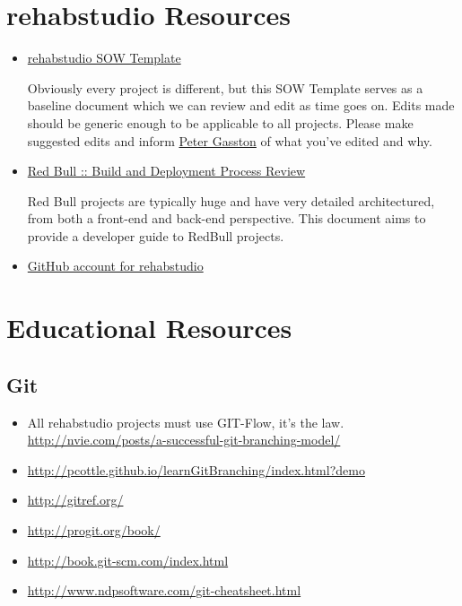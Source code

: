 \documentclass[letterpaper,10pt,english]{sphinxmanual}
\begin{document}
\section{rehabstudio Resources}
\label{resources:rehabstudio-resources}\begin{itemize}
\item {} 
\href{https://docs.google.com/a/rehabstudio.com/document/d/1OH39dbghjzTWmhfLngvC0pRRFPx8mfN8ABfTTF6buOQ/edit}{rehabstudio SOW Template}

Obviously every project is different, but this SOW Template serves as a baseline document which we can review and edit as time goes on.  Edits made should be generic enough to be applicable to all projects.  Please make suggested edits and inform \href{mailto:peter@rehabstudio.com}{Peter Gasston} of what you've edited and why.

\item {} 
\href{https://docs.google.com/a/rehabstudio.com/document/d/1humc\_GAfWQwqr4BGNeRd2zIOXbBrmnnvpbHk6yR-Hnw/edit\#}{Red Bull :: Build and Deployment Process Review}

Red Bull projects are typically huge and have very detailed architectured, from both a front-end and back-end perspective.  This document aims to provide a developer guide to RedBull projects.

\item {} 
\href{https://github.com/rehabstudio}{GitHub account for rehabstudio}

\end{itemize}


\section{Educational Resources}
\label{resources:educational-resources}

\subsection{Git}
\label{resources:git}\begin{itemize}
\item {} 
All rehabstudio projects must use GIT-Flow, it's the law. \href{http://nvie.com/posts/a-successful-git-branching-model/}{http://nvie.com/posts/a-successful-git-branching-model/}

\item {} 
\href{http://pcottle.github.io/learnGitBranching/index.html?demo}{http://pcottle.github.io/learnGitBranching/index.html?demo}

\item {} 
\href{http://gitref.org/}{http://gitref.org/}

\item {} 
\href{http://progit.org/book/}{http://progit.org/book/}

\item {} 
\href{http://book.git-scm.com/index.html}{http://book.git-scm.com/index.html}

\item {} 
\href{http://www.ndpsoftware.com/git-cheatsheet.html}{http://www.ndpsoftware.com/git-cheatsheet.html}

\end{itemize}
\end{document}
